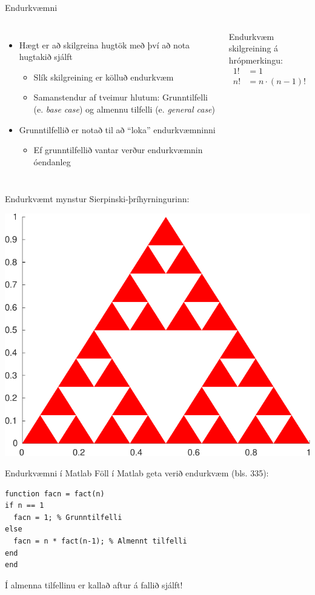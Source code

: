 \documentclass{beamer}
\begin{document}
\begin{frame}[fragile]{Endurkvæmni}
\begin{columns}
\begin{itemize}
 \item Hægt er að skilgreina hugtök með því að nota hugtakið sjálft
 \begin{itemize}
  \item Slík skilgreining er kölluð endurkvæm
  \item Samanstendur af tveimur hlutum: Grunntilfelli (e. \emph{base case}) og almennu tilfelli (e. \emph{general case})
 \end{itemize}
 \item Grunntilfellið er notað til að ``loka'' endurkvæmninni
 \begin{itemize}
  \item Ef grunntilfellið vantar verður endurkvæmnin óendanleg
 \end{itemize}
\end{itemize}

\vspace{0.1cm}
Endurkvæm skilgreining á hrópmerkingu:
\begin{align*}
1! &= 1\\
n! &= n\cdot(n-1)!\\
\end{align*}

\end{columns}
\end{frame}

\begin{frame}{Endurkvæmt mynstur}
Sierpinski-þríhyrningurinn:
\begin{center}
\includegraphics[width=0.6\linewidth]{Pics/sierpinski}
\end{center}
\end{frame}

\begin{frame}[fragile]{Endurkvæmni í Matlab}
Föll í Matlab geta verið endurkvæm (bls. 335):
\begin{verbatim}
function facn = fact(n)
if n == 1
  facn = 1; % Grunntilfelli
else
  facn = n * fact(n-1); % Almennt tilfelli
end
end
\end{verbatim}
Í almenna tilfellinu er kallað aftur á fallið sjálft!
\end{frame}
\end{document}
